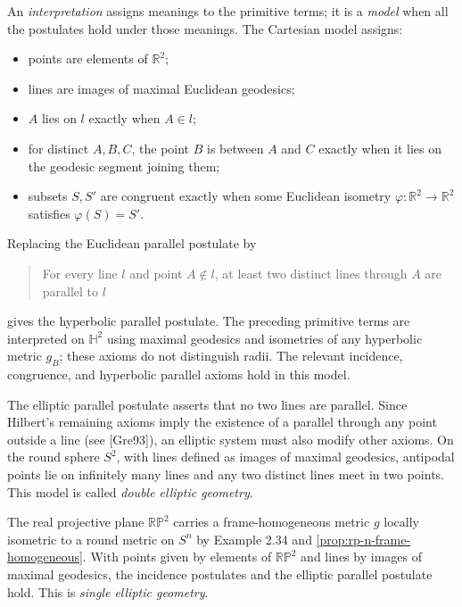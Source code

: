 An \emph{interpretation} assigns meanings to the primitive terms; it is a
\emph{model} when all the postulates hold under those meanings. The Cartesian
model assigns:
\begin{itemize}
\item points are elements of $\mathbb R^2$;
\item lines are images of maximal Euclidean geodesics;
\item $A$ lies on $l$ exactly when $A\in l$;
\item for distinct $A,B,C$, the point $B$ is between $A$ and $C$ exactly when
it lies on the geodesic segment joining them;
\item subsets $S,S'$ are congruent exactly when some Euclidean isometry
$\varphi\colon\mathbb R^2\to\mathbb R^2$ satisfies $\varphi(S)=S'$.
\end{itemize}

Replacing the Euclidean parallel postulate by
\begin{quote}
For every line $l$ and point $A\notin l$, at least two distinct lines through
$A$ are parallel to $l$
\end{quote}
gives the hyperbolic parallel postulate. The preceding primitive terms are
interpreted on $\mathbb H^2$ using maximal geodesics and isometries of any
hyperbolic metric $g_B$; these axioms do not distinguish radii. The relevant
incidence, congruence, and hyperbolic parallel axioms hold in this model.

The elliptic parallel postulate asserts that no two lines are parallel. Since
Hilbert's remaining axioms imply the existence of a parallel through any point
outside a line (see [Gre93]), an elliptic system must also modify other axioms.
On the round sphere $S^2$, with lines defined as images of maximal geodesics,
antipodal points lie on infinitely many lines and any two distinct lines meet
in two points. This model is called \emph{double elliptic geometry}.

\begin{example}
\label{ex:real-projective-plane-elliptic-geometry}
The real projective plane $\mathbb{RP}^2$ carries a frame-homogeneous metric
$g$ locally isometric to a round metric on $S^n$ by Example 2.34 and
\cref{prop:rp-n-frame-homogeneous}. With points given by elements of
$\mathbb{RP}^2$ and lines by
images of maximal geodesics, the incidence postulates and the elliptic parallel
postulate hold. This is \emph{single elliptic geometry}.
\end{example}
